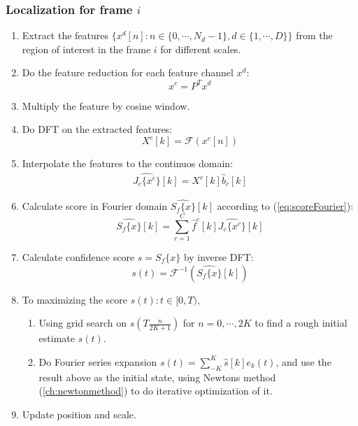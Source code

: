 \documentclass[12pt]{article}
\numberwithin{equation}{section}
\begin{document}
{\subsubsection{Localization for frame $i$}
\begin{enumerate}
	\item Extract the features $\{x^d[n]: n \in \{0, \cdots, N_d -1\}, d \in \{1, \cdots, D\}\}$ from the region of interest in the frame $i$ for different scales.
	\item Do the feature reduction for each feature channel $x^d$:
	\begin{equation}
		 x^c = P^Tx^d
	\end{equation} 
	\item Multiply the feature by cosine window.
	\item Do DFT on the extracted features:
		\begin{equation} 
			X^c[k] = \mathcal{F} (x^c[n])
		\end{equation} \par	
	\item Interpolate the features to the continuos domain:
		\begin{align}
			\widehat{J_c\{x^c\}}[k]=X^c[k] \hat{b}_c[k] 
		\end{align} \par 
	\item Calculate score in Fourier domain $\widehat{S_f\{x\}}[k]$ according to (\ref{eq:scoreFourier}):
		\begin{equation}
			\widehat{S_f\{x\}}[k]=\sum^C_{c=1} \hat{f}^c[k] \widehat{J_c\{x^c\}}[k]
		\end{equation} \par
	\item Calculate confidence score $s=S_f\{x\}$ by inverse DFT:
		\begin{equation} 
			s(t)=\mathcal{F}^{-1}(\widehat{S_f\{x\}}[k])
		\end{equation} \par
	\item To maximizing the score $s(t): t\in [0,T)$,
		\begin{enumerate}
			\item Using grid search on $s(T\frac{n}{2K+1})$ for $n=0, \cdots, 2K$ to find a rough
			 initial estimate $s(t)$.
			\item Do Fourier series expansion $s(t)=\sum^K_{-K}\hat{s}[k]e_k(t)$, and use the result above
			as the initial state, using Newtons method (\ref{ch:newtonmethod}) to do iterative optimization of it.
		\end{enumerate}
	\item Update position and scale.
\end{enumerate}

}
\end{document}

